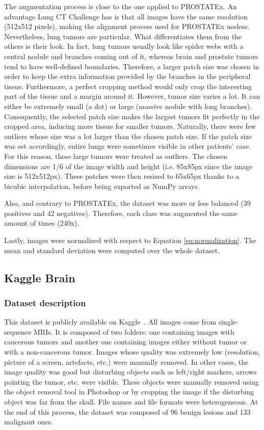 The augmentation process is close to the one applied to PROSTATEx. An advantage Lung CT Challenge has is that all images have the same resolution (512x512 pixels), making the alignment process used for PROSTATEx useless. Nevertheless, lung tumors are particular. What differentiates them from the others is their look. In fact, lung tumors usually look like spider webs with a central nodule and branches coming out of it, whereas brain and prostate tumors tend to have well-defined boundaries. Therefore, a larger patch size was chosen in order to keep the extra information provided by the branches in the peripheral tissue. Furthermore, a perfect cropping method would only crop the interesting part of the tissue and a margin around it. However, tumor size varies a lot. It can either be extremely small (a dot) or large (massive nodule with long branches). Consequently, the selected patch size makes the largest tumors fit perfectly in the cropped area, inducing more tissue for smaller tumors. Naturally, there were few outliers whose size was a lot larger than the chosen patch size. If the patch size was set accordingly, entire lungs were sometimes visible in other patients' case. For this reason, these large tumors were treated as outliers. The chosen dimensions are 1/6 of the image width and height (i.e. 85x85px since the image size is 512x512px). These patches were then resized to 65x65px thanks to a bicubic interpolation, before being exported as NumPy arrays.

Also, and contrary to PROSTATEx, the dataset was more or less balanced (39 positives and 42 negatives). Therefore, each class was augmented the same amount of times (240x). 

Lastly, images were normalized with respect to Equation \ref{eq:normalization}. The mean and standard deviation were computed over the whole dataset. 


\subsection{Kaggle Brain}
\label{sec:kaggleBrain}
\subsubsection{Dataset description}
\setlength{\marginparwidth}{3cm}\leavevmode {}This dataset is publicly available on Kaggle~\cite{51}. All images come from single-sequence MRIs. It is composed of two folders: one containing images with cancerous tumors and another one containing images either without tumor or with a non-cancerous tumor. Images whose quality was extremely low (resolution, picture of a screen, artefacts, etc.) were manually removed. In other cases, the image quality was good but disturbing objects such as left/right markers, arrows pointing the tumor, etc. were visible. These objects were manually removed using the object removal tool in Photoshop or by cropping the image if the disturbing object was far from the skull. File names and file formats were heterogeneous. At the end of this process, the dataset was composed of 96 benign lesions and 133 malignant ones.


